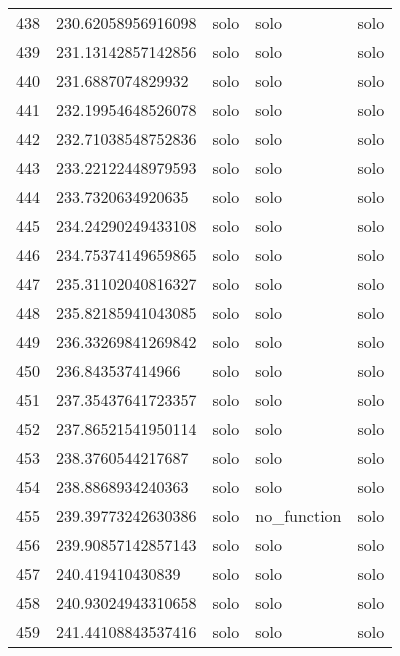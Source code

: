 \begin{table}[]
\begin{tabular}{lllll}
    438  & 230.62058956916098 & solo         & solo            & solo           \\
    439  & 231.13142857142856 & solo         & solo            & solo           \\
    440  & 231.6887074829932  & solo         & solo            & solo           \\
    441  & 232.19954648526078 & solo         & solo            & solo           \\
    442  & 232.71038548752836 & solo         & solo            & solo           \\
    443  & 233.22122448979593 & solo         & solo            & solo           \\
    444  & 233.7320634920635  & solo         & solo            & solo           \\
    445  & 234.24290249433108 & solo         & solo            & solo           \\
    446  & 234.75374149659865 & solo         & solo            & solo           \\
    447  & 235.31102040816327 & solo         & solo            & solo           \\
    448  & 235.82185941043085 & solo         & solo            & solo           \\
    449  & 236.33269841269842 & solo         & solo            & solo           \\
    450  & 236.843537414966   & solo         & solo            & solo           \\
    451  & 237.35437641723357 & solo         & solo            & solo           \\
    452  & 237.86521541950114 & solo         & solo            & solo           \\
    453  & 238.3760544217687  & solo         & solo            & solo           \\
    454  & 238.8868934240363  & solo         & solo            & solo           \\
    455  & 239.39773242630386 & solo         & no\_function    & solo           \\
    456  & 239.90857142857143 & solo         & solo            & solo           \\
    457  & 240.419410430839   & solo         & solo            & solo           \\
    458  & 240.93024943310658 & solo         & solo            & solo           \\
    459  & 241.44108843537416 & solo         & solo            & solo           \\

\end{tabular}
\end{table}
